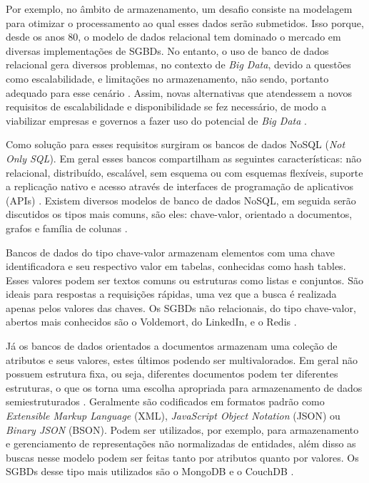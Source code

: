 Por exemplo, no âmbito de armazenamento, um desafio consiste na modelagem para otimizar o 
processamento ao qual esses dados serão submetidos. Isso porque, desde os anos 80, o modelo 
de dados relacional tem dominado o mercado em diversas implementações de SGBDs. No entanto, 
o uso de banco de dados relacional gera diversos problemas, no contexto de \textit{Big Data}, 
devido a questões como escalabilidade, e limitações no armazenamento, não sendo, portanto 
adequado para esse cenário \cite{moniruzzaman2013nosql}. Assim, novas alternativas que 
atendessem a novos requisitos de escalabilidade e disponibilidade se fez necessário, de modo 
a viabilizar empresas e governos a fazer uso do potencial de \textit{Big Data} 
\cite{de2010nosql}.

Como solução para esses requisitos surgiram os bancos de dados NoSQL (\textit{Not Only SQL}). 
Em geral esses bancos compartilham as seguintes características: não relacional, distribuído, 
escalável, sem esquema ou com esquemas flexíveis, suporte a replicação nativo e acesso 
através de interfaces de programação de aplicativos (APIs) \cite{de2010nosql}. 
Existem diversos modelos de banco de dados NoSQL, em seguida serão discutidos os tipos mais 
comuns, são eles: chave-valor, orientado a documentos, grafos e família de colunas 
\cite{de2010nosql}.

Bancos de dados do tipo chave-valor armazenam elementos com uma chave identificadora e seu 
respectivo valor em tabelas, conhecidas como hash tables. Esses valores podem ser textos 
comuns ou estruturas como listas e conjuntos. São ideais para respostas a requisições 
rápidas, uma vez que a busca é realizada apenas pelos valores das chaves. Os SGBDs não 
relacionais, do tipo chave-valor, abertos mais conhecidos são o Voldemort, do LinkedIn, e o 
Redis \cite{moniruzzaman2013nosql}.

Já os bancos de dados orientados a documentos armazenam uma coleção de atributos e seus 
valores, estes últimos podendo ser multivalorados. Em geral não possuem estrutura fixa, 
ou seja, diferentes documentos podem ter diferentes estruturas, o que os torna uma escolha 
apropriada para armazenamento de dados semiestruturados \cite{de2010nosql}. 
Geralmente são codificados em formatos padrão como \textit{Extensible Markup Language} (XML), 
\textit{JavaScript Object Notation} (JSON) ou \textit{Binary JSON} (BSON).  Podem ser 
utilizados, por exemplo, para armazenamento e gerenciamento de representações não normalizadas 
de entidades, além disso as buscas nesse modelo podem ser feitas tanto por atributos quanto 
por valores. Os SGBDs desse tipo mais utilizados são o MongoDB e o CouchDB 
\cite{moniruzzaman2013nosql}.

